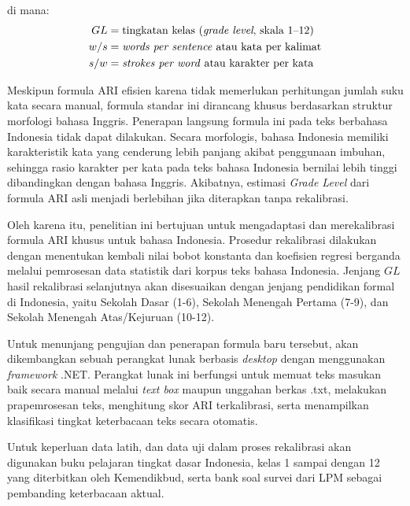 \documentclass[a4paper,twoside]{article}
\begin{document}
di mana:
\begin{align*}
GL &= \text{tingkatan kelas (\textit{grade level}, skala 1--12)} \\
w/s &= \text{\textit{words per sentence} atau kata per kalimat} \\
s/w &= \text{\textit{strokes per word} atau karakter per kata}
\end{align*}

Meskipun formula ARI efisien karena tidak memerlukan perhitungan jumlah suku kata secara manual, formula standar ini dirancang khusus berdasarkan struktur morfologi bahasa Inggris. Penerapan langsung formula ini pada teks berbahasa Indonesia tidak dapat dilakukan. Secara morfologis, bahasa Indonesia memiliki karakteristik kata yang cenderung lebih panjang akibat penggunaan imbuhan, sehingga rasio karakter per kata pada teks bahasa Indonesia bernilai lebih tinggi dibandingkan dengan bahasa Inggris. Akibatnya, estimasi \textit{Grade Level} dari formula ARI asli menjadi berlebihan jika diterapkan tanpa rekalibrasi.

Oleh karena itu, penelitian ini bertujuan untuk mengadaptasi dan merekalibrasi formula ARI khusus untuk bahasa Indonesia. Prosedur rekalibrasi dilakukan dengan menentukan kembali nilai bobot konstanta dan koefisien regresi berganda melalui pemrosesan data statistik dari korpus teks bahasa Indonesia. Jenjang $GL$ hasil rekalibrasi selanjutnya akan disesuaikan dengan jenjang pendidikan formal di Indonesia, yaitu Sekolah Dasar (1-6), Sekolah Menengah Pertama (7-9), dan Sekolah Menengah Atas/Kejuruan (10-12).

Untuk menunjang pengujian dan penerapan formula baru tersebut, akan dikembangkan sebuah perangkat lunak berbasis \textit{desktop} dengan menggunakan \textit{framework} .NET. Perangkat lunak ini berfungsi untuk memuat teks masukan baik secara manual melalui \textit{text box} maupun unggahan berkas .txt, melakukan prapemrosesan teks, menghitung skor ARI terkalibrasi, serta menampilkan klasifikasi tingkat keterbacaan teks secara otomatis.

Untuk keperluan data latih, dan data uji dalam proses rekalibrasi akan digunakan buku pelajaran tingkat dasar Indonesia, kelas 1 sampai dengan 12 yang diterbitkan oleh Kemendikbud, serta bank soal survei dari LPM sebagai pembanding keterbacaan aktual.
\end{document}
